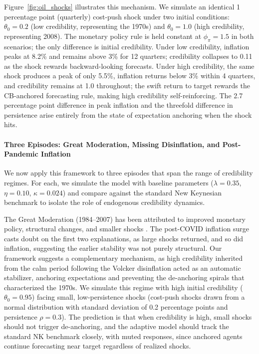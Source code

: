\documentclass[10pt]{article}
\begin{document}
Figure~\ref{fig:oil_shocks} illustrates this mechanism. We simulate an identical 1 percentage point (quarterly) cost-push shock under two initial conditions: $\theta_0 = 0.2$ (low credibility, representing the 1970s) and $\theta_0 = 1.0$ (high credibility, representing 2008). The monetary policy rule is held constant at $\phi_\pi = 1.5$ in both scenarios; the only difference is initial credibility. Under low credibility, inflation peaks at 8.2\% and remains above 3\% for 12 quarters; credibility collapses to 0.11 as the shock rewards backward-looking forecasts. Under high credibility, the same shock produces a peak of only 5.5\%, inflation returns below 3\% within 4 quarters, and credibility remains at 1.0 throughout; the swift return to target rewards the CB-anchored forecasting rule, making high credibility self-reinforcing. The 2.7 percentage point difference in peak inflation and the threefold difference in persistence arise entirely from the state of expectation anchoring when the shock hits. 

\paragraph{Three Episodes: Great Moderation, Missing Disinflation, and Post-Pandemic Inflation} We now apply this framework to three episodes that span the range of credibility regimes. For each, we simulate the model with baseline parameters ($\lambda = 0.35$, $\eta = 0.10$, $\kappa = 0.024$) and compare against the standard New Keynesian benchmark to isolate the role of endogenous credibility dynamics.

The Great Moderation (1984–2007) has been attributed to improved monetary policy, structural changes, and smaller shocks \citep{stock2003has, bernanke2004great}. The post-COVID inflation surge casts doubt on the first two explanations, as large shocks returned, and so did inflation, suggesting the earlier stability was not purely structural. Our framework suggests a complementary mechanism, as high credibility inherited from the calm period following the Volcker disinflation acted as an automatic stabilizer, anchoring expectations and preventing the de-anchoring spirals that characterized the 1970s. We simulate this regime with high initial credibility ($\theta_0 = 0.95$) facing small, low-persistence shocks (cost-push shocks drawn from a normal distribution with standard deviation of 0.2 percentage points and persistence $\rho = 0.3$). The prediction is that when credibility is high, small shocks should not trigger de-anchoring, and the adaptive model should track the standard NK  benchmark closely, with muted responses, since anchored agents continue forecasting near target regardless of realized shocks.
\end{document}
